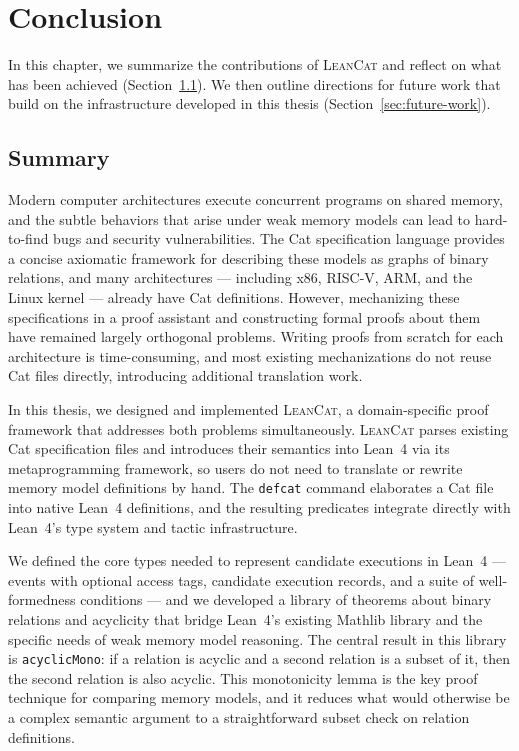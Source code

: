 \chapter{Conclusion}
\label{chapter:conclusion}

In this chapter, we summarize the contributions of \textsc{LeanCat} and reflect on what has been achieved (Section~\ref{sec:summary}). We then outline directions for future work that build on the infrastructure developed in this thesis (Section~\ref{sec:future-work}).

\section{Summary}
\label{sec:summary}

Modern computer architectures execute concurrent programs on shared memory, and the subtle behaviors that arise under weak memory models can lead to hard-to-find bugs and security vulnerabilities. The Cat specification language provides a concise axiomatic framework for describing these models as graphs of binary relations, and many architectures --- including x86, RISC-V, ARM, and the Linux kernel --- already have Cat definitions. However, mechanizing these specifications in a proof assistant and constructing formal proofs about them have remained largely orthogonal problems. Writing proofs from scratch for each architecture is time-consuming, and most existing mechanizations do not reuse Cat files directly, introducing additional translation work.

In this thesis, we designed and implemented \textsc{LeanCat}, a domain-specific proof framework that addresses both problems simultaneously. \textsc{LeanCat} parses existing Cat specification files and introduces their semantics into Lean~4 via its metaprogramming framework, so users do not need to translate or rewrite memory model definitions by hand. The \texttt{defcat} command elaborates a Cat file into native Lean~4 definitions, and the resulting predicates integrate directly with Lean~4's type system and tactic infrastructure.

We defined the core types needed to represent candidate executions in Lean~4 --- events with optional access tags, candidate execution records, and a suite of well-formedness conditions --- and we developed a library of theorems about binary relations and acyclicity that bridge Lean~4's existing Mathlib library and the specific needs of weak memory model reasoning. The central result in this library is \texttt{acyclicMono}: if a relation is acyclic and a second relation is a subset of it, then the second relation is also acyclic. This monotonicity lemma is the key proof technique for comparing memory models, and it reduces what would otherwise be a complex semantic argument to a straightforward subset check on relation definitions.

